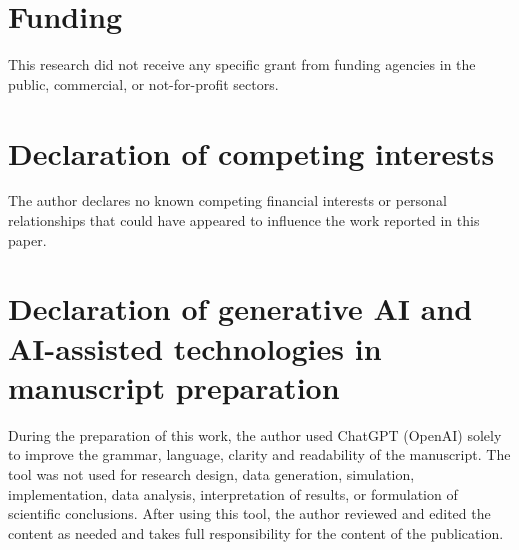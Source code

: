 \section{Funding}\label{funding}

This research did not receive any specific grant from funding agencies in the public, commercial, or not-for-profit sectors.

\section{Declaration of competing interests}\label{declaration-of-competing-interests}

The author declares no known competing financial interests or personal relationships that could have appeared to influence the work reported in this paper.

\section{Declaration of generative AI and AI-assisted technologies in manuscript preparation}\label{declaration-of-generative-ai-and-ai-assisted-technologies-in-manuscript-preparation}

During the preparation of this work, the author used ChatGPT (OpenAI) solely to improve the grammar, language, clarity and readability of the manuscript. The tool was not used for research design, data generation, simulation, implementation, data analysis, interpretation of results, or formulation of scientific conclusions. After using this tool, the author reviewed and edited the content as needed and takes full responsibility for the content of the publication.
